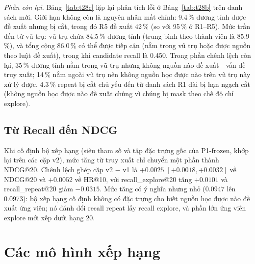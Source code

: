 \documentclass[jtehm]{ieeeaccess}
\begin{document}
\textit{Phần còn lại.} Bảng~\ref{tab:t28c} lặp lại phân tích lỗi ở Bảng~\ref{tab:t28b} trên danh sách mới. Giới hạn không còn là nguyên nhân mất chính: 9.4\,\% dương tính được đề xuất nhưng bị cắt, trong đó R5 đề xuất 42\,\% (so với 95\,\% ở R1--R5). Mức trần đến từ vũ trụ: vũ trụ chứa 84.5\,\% dương tính (trung bình theo thành viên là 85.9\,\%), và tổng cộng 86.0\,\% có thể được tiếp cận (nằm trong vũ trụ hoặc được nguồn theo luật đề xuất), trong khi candidate recall là 0.450. Trong phần chênh lệch còn lại, 35\,\% dương tính nằm trong vũ trụ nhưng không nguồn nào đề xuất—vấn đề truy xuất; 14\,\% nằm ngoài vũ trụ nên không nguồn học được nào trên vũ trụ này xử lý được. 4.3\,\% repeat bị cắt chủ yếu đến từ danh sách R1 dài bị hạn ngạch cắt (không nguồn học được nào đề xuất chúng vì chúng bị mask theo chế độ chỉ explore).

\subsection{Từ Recall đến NDCG}
Khi cố định bộ xếp hạng (siêu tham số và tập đặc trưng gốc của P1-frozen, khớp lại trên các cặp v2), mức tăng từ truy xuất chỉ chuyển một phần thành NDCG@20. Chênh lệch ghép cặp v2 $-$ v1 là $+0.0025$ $[+0.0018, +0.0032]$ về NDCG@20 và $+0.0052$ về HR@10, với recall\_explore@20 tăng $+0.0101$ và recall\_repeat@20 giảm $-0.0315$. Mức tăng có ý nghĩa nhưng nhỏ (0.0947 lên 0.0973): bộ xếp hạng cố định không có đặc trưng cho biết nguồn học được nào đề xuất ứng viên; nó đánh đổi recall repeat lấy recall explore, và phần lớn ứng viên explore mới xếp dưới hạng 20.

\section{Các mô hình xếp hạng}
\label{sec:ranking}
\end{document}
